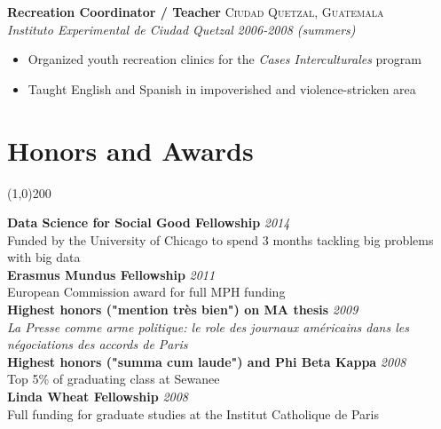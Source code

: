 \documentclass[11pt]{article}
\begin{document}
\noindent \textbf{Recreation Coordinator / Teacher} \hfill \textsc{Ciudad Quetzal, Guatemala}\\
\noindent \emph{Instituto Experimental de Ciudad Quetzal} \hfill \emph{2006-2008 (summers)}
\vspace{-2mm}
\begin{itemize}\itemsep0pt \parskip0pt 
\item Organized youth recreation clinics for the \textit{Cases Interculturales} program
\item Taught English and Spanish in impoverished and violence-stricken area
\end{itemize}



\section*{Honors and Awards} %
\vspace{-7mm}
\line(1,0){200}
\vspace{2mm}


\noindent \textbf{Data Science for Social Good Fellowship} \hfill \emph{2014}\\
\noindent Funded by the University of Chicago to spend 3 months tackling big problems with big data \\

\noindent \textbf{Erasmus Mundus Fellowship} \hfill \emph{2011}\\
\noindent European Commission award for full MPH funding \\

\noindent \textbf{Highest honors ("mention très bien") on MA thesis} \hfill \emph{2009}\\
\noindent \textit{La Presse comme arme politique: le role des journaux américains dans les négociations des accords de Paris}\\

\noindent \textbf{Highest honors ("summa cum laude") and Phi Beta Kappa}  \hfill \emph{2008}\\
\noindent Top 5\% of graduating class at Sewanee  \\

\noindent \textbf{Linda Wheat Fellowship}  \hfill \emph{2008}\\
\noindent Full funding for graduate studies at the Institut Catholique de Paris  \\
\end{document}

